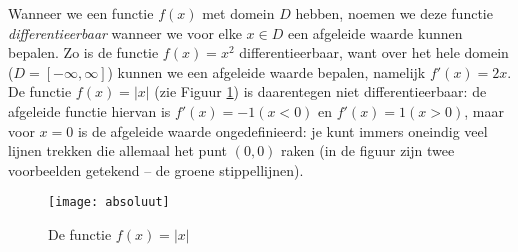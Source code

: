 Wanneer we een functie $f(x)$ met domein $D$ hebben, noemen we deze functie \textit{differentieerbaar} wanneer we voor elke $x \in D$ een afgeleide waarde kunnen bepalen. Zo is de functie $f(x) = x^2$ differentieerbaar, want over het hele domein ($D = \left[-\infty, \infty\right]$) kunnen we een afgeleide waarde bepalen, namelijk $f'(x)=2x$. De functie $f(x)=|x|$ (zie Figuur \ref{img:abs}) is daarentegen niet differentieerbaar: de afgeleide functie hiervan is $f'(x)=-1 (x<0)$ en $f'(x)=1 (x>0)$, maar voor $x=0$ is de afgeleide waarde ongedefinieerd: je kunt immers oneindig veel lijnen trekken die allemaal het punt $(0,0)$ raken (in de figuur zijn twee voorbeelden getekend – de groene stippellijnen).

\begin{figure}[h]
    \centering
    \texttt{[image: absoluut]}
    \caption{De functie $f(x) = |x|$\label{img:abs}}
\end{figure}
